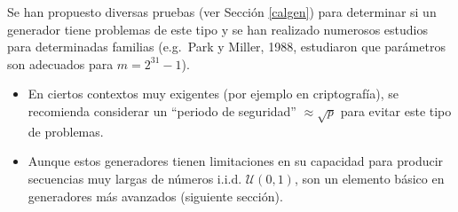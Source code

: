 \documentclass[
]{book}
\theoremstyle{break}
\theoremstyle{nonumberplain}
\begin{document}
Se han propuesto diversas pruebas (ver Sección \ref{calgen}) para
determinar si un generador tiene problemas de este tipo y se han
realizado numerosos estudios para determinadas familias (e.g.~Park y
Miller, 1988, estudiaron que parámetros son adecuados para \(m=2^{31}-1\)).

\begin{itemize}
\item
  En ciertos contextos muy exigentes (por ejemplo en criptografía), se recomienda
  considerar un ``periodo de seguridad'' \(\approx \sqrt{p}\) para evitar este tipo
  de problemas.
\item
  Aunque estos generadores tienen limitaciones en su capacidad para
  producir secuencias muy largas de números i.i.d. \(\mathcal{U}(0,1)\),
  son un elemento básico en generadores más avanzados (siguiente sección).
\end{itemize}
\end{document}
